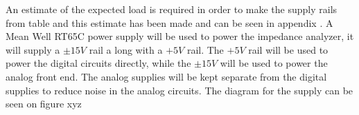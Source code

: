 An estimate of the expected load is required in order to make the supply rails from table  and this estimate has been made and can be seen in appendix . A Mean Well RT65C\cite{RT65C} power supply will be used to power the impedance analyzer, it will supply a $\pm 15V$ rail a long with a $+5V$ rail. The $+5V$ rail will be used to power the digital circuits directly, while the $\pm 15V$ will be used to power the analog front end. The analog supplies will be kept separate from the digital supplies to reduce noise in the analog circuits. The diagram for the supply can be seen on figure xyz




